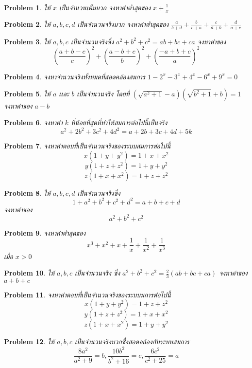 \documentclass[a4paper,12pt]{article}
\newtheorem{problem}{Problem}
\begin{document}
	
	
	
	\begin{problem}
		ให้ $x$ เป็นจำนวนเต็มบวก จงหาค่าต่ำสุดของ $x+\frac{1}{x}$
	\end{problem}
	\begin{problem}
		ให้ $a,b,c,d$ เป็นจำนวนจริงบวก จงหาค่าต่ำสุดของ $\frac{a}{b+d}+\frac{b}{c+a}+\frac{c}{d+b}+\frac{d}{a+c}$
	\end{problem}
	\begin{problem}
		ให้ $a,b,c$ เป็นจำนวนจริงซึ่ง $a^2+b^2+c^2=ab+bc+ca$ จงหาค่าของ $$(\frac{a+b-c}{c})^2+(\frac{a-b+c}{b})^2+(\frac{-a+b+c}{a})^2$$
	\end{problem}
	\begin{problem}
		จงหาจำนวนจริงทั้งหมดที่สอดคล้องสมการ $1-2^x-3^x+4^x-6^x+9^x=0$
	\end{problem}
	\begin{problem}
		ให้ $a$ เเละ $b$ เป็นจำนวนจริง โดยที่ $(\sqrt{a^2+1}-a)(\sqrt{b^2+1}+b)=1$ จงหาค่าของ $a-b$
	\end{problem}
	\begin{problem}
		จงหาค่า $k$ ที่น้อยที่สุดที่ทำให้สมการต่อไปนี้เป็นจริง
		$$a^2+2b^2+3c^2+4d^2=a+2b+3c+4d+5k$$
	\end{problem}
	\begin{problem}
		จงหาคำตอบที่เป็นจำนวนจริงของระบบสมการต่อไปนี้
		$$x(1+y+y^2)=1+x+x^2$$
		$$y(1+z+z^2)=1+y+y^2$$
		$$z(1+x+x^2)=1+z+z^2$$
	\end{problem}
	\begin{problem}
		ให้ $a,b,c,d$ เป็นจำนวนจริงซึ่ง $$1+a^2+b^2+c^2+d^2=a+b+c+d$$จงหาค่าของ
		$$a^2+b^2+c^2$$
	\end{problem}
	\begin{problem}
		จงหาค่าต่ำสุดของ $$x^3+x^2+x+\frac{1}{x}+\frac{1}{x^2}+\frac{1}{x^3}$$ เมื่อ $x>0$
	\end{problem}
	\begin{problem}
		ให้ $a,b,c$ เป็นจำนวนจริง ซึ่ง $a^2+b^2+c^2= \frac{2}{3}(ab+bc+ca)$ จงหาค่าของ $a+b+c$
	\end{problem}
	\begin{problem}
		จงหาคำตอบที่เป็นจำนวนจริงของระบบมการต่อไปนี้
		$$x(1+y+y^2)=1+z+z^2$$
		$$y(1+z+z^2)=1+x+x^2$$
		$$z(1+x+x^2)=1+y+y^2$$
	\end{problem}
	\begin{problem}
	ให้ $a,b,c$ เป็นจำนวนจริงบวกซึ่งสอดคล้องกับระบบสมการ
	$$\frac{8a^2}{a^2+9}=b,\frac{10b^2}{b^2+16}=c,\frac{6c^2}{c^2+25}=a$$
	
	\end{problem}
\end{document}
